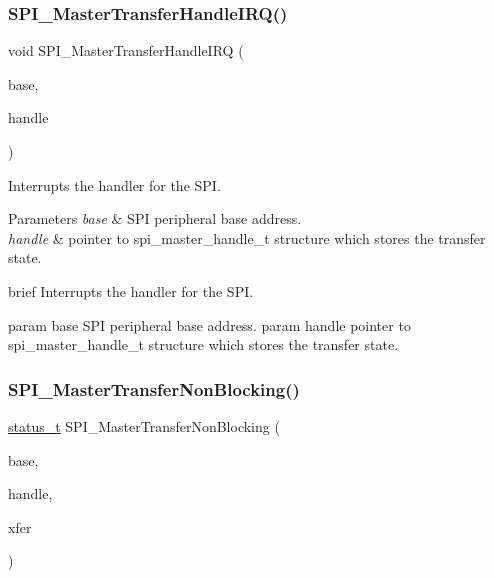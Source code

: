 \subsubsection{\texorpdfstring{SPI\_MasterTransferHandleIRQ()}{SPI\_MasterTransferHandleIRQ()}}
{\footnotesize\ttfamily void S\+P\+I\+\_\+\+Master\+Transfer\+Handle\+I\+RQ (\begin{DoxyParamCaption}\item[{\mbox{\hyperlink{struct_s_p_i___type}{S\+P\+I\+\_\+\+Type}} $\ast$}]{base,  }\item[{\mbox{\hyperlink{struct__spi__master__handle}{spi\+\_\+master\+\_\+handle\+\_\+t}} $\ast$}]{handle }\end{DoxyParamCaption})}



Interrupts the handler for the S\+PI. 


\begin{DoxyParams}{Parameters}
{\em base} & S\+PI peripheral base address. \\
\hline
{\em handle} & pointer to spi\+\_\+master\+\_\+handle\+\_\+t structure which stores the transfer state.\\
\hline
\end{DoxyParams}
brief Interrupts the handler for the S\+PI.

param base S\+PI peripheral base address. param handle pointer to spi\+\_\+master\+\_\+handle\+\_\+t structure which stores the transfer state. \mbox{\label{group__spi__driver_ga820c78a32fa29735168d2e517f4881a1}} 
\subsubsection{\texorpdfstring{SPI\_MasterTransferNonBlocking()}{SPI\_MasterTransferNonBlocking()}}
{\footnotesize\ttfamily \mbox{\hyperlink{group__ksdk__common_gaaabdaf7ee58ca7269bd4bf24efcde092}{status\+\_\+t}} S\+P\+I\+\_\+\+Master\+Transfer\+Non\+Blocking (\begin{DoxyParamCaption}\item[{\mbox{\hyperlink{struct_s_p_i___type}{S\+P\+I\+\_\+\+Type}} $\ast$}]{base,  }\item[{\mbox{\hyperlink{struct__spi__master__handle}{spi\+\_\+master\+\_\+handle\+\_\+t}} $\ast$}]{handle,  }\item[{\mbox{\hyperlink{group__spi__driver_ga59314d5596f240cfbe8b9466bd99ed3f}{spi\+\_\+transfer\+\_\+t}} $\ast$}]{xfer }\end{DoxyParamCaption})}



